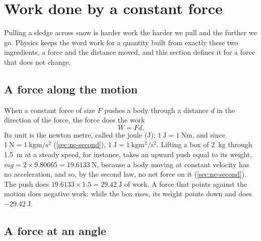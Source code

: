 \section{Work done by a constant force}
\label{sec:en-constant}

Pulling a sledge across snow is harder work the harder we pull and the
further we go. Physics keeps the word work for a quantity built from
exactly these two ingredients, a force and the distance moved, and this
section defines it for a force that does not change.

\subsection*{A force along the motion}

When a constant force of size $F$ pushes a body through a distance $d$
in the direction of the force, the force does the work
\begin{equation*}
   W = F d .
\end{equation*}
Its unit is the newton metre, called the joule (\si{\joule}): $\SI{1}{
\joule} = \SI{1}{\newton\metre}$, and since $\SI{1}{\newton} =
\SI{1}{\kilogram\metre\per\second\squared}$ (\cref{sec:ne-second}),
$\SI{1}{\joule} = \SI{1}{\kilogram\metre\squared\per\second\squared}$.
Lifting a box of \SI{2}{\kilogram} through \SI{1.5}{\metre} at a steady
speed, for instance, takes an upward push equal to its weight, $mg = 2
\times 9.80665 = \SI{19.6133}{\newton}$, because a body moving at constant
velocity has no acceleration, and so, by the second law, no net force
on it (\cref{sec:ne-second}). The push does
$19.6133\times1.5 = \SI{29.42}{\joule}$ of work. A force that points
against the motion does negative work: while the box rises, its weight
points down and does $\SI{-29.42}{\joule}$.

\subsection*{A force at an angle}

